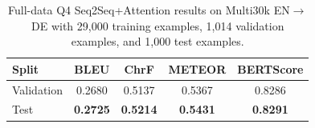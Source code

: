 \begin{table}[H]
\centering
\small
\begin{tabular}{lcccc}
\toprule
Split & BLEU & ChrF & METEOR & BERTScore \\
\midrule
Validation & 0.2680 & 0.5137 & 0.5367 & 0.8286 \\
Test & \textbf{0.2725} & \textbf{0.5214} & \textbf{0.5431} & \textbf{0.8291} \\
\bottomrule
\end{tabular}
\caption{Full-data Q4 Seq2Seq+Attention results on Multi30k EN$\to$DE with 29{,}000 training examples, 1{,}014 validation examples, and 1{,}000 test examples.}
\label{tab:q4_overall_results}
\end{table}